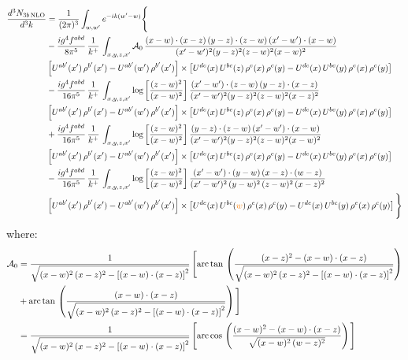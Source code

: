 \documentclass[9pt]{article}
\numberwithin{equation}{section}
\begin{document}
\begin{align}
\frac{d^{3}N_{3b\,\rm NLO}}{d^{3}k} & = \frac{1}{(2\pi)^{3}}\int_{w,w'}e^{-ik(w'-w)}\Bigg\{\notag \\
&-\frac{ig^{4}f^{abd}}{8\pi^{5}}\,\frac{1}{k^{+}}\,\int_{x,y,z,x'}\mathcal{A}_{0}\,
\frac{(x-w)\cdot(x-z)\,(y-z)\cdot(z-w)\,(x'-w')\cdot(x-w)}{(x'-w')^{2}(y-z)^{2}(z-w)^{2}(x-w)^{2}}\notag \\ & \left[U^{ab'}(x')\,\rho^{b'}(x')-U^{ab'}(w')\, \rho^{b'}(x')\right]\times \left[U^{de}(x)\,U^{bc}(z)\, \rho^{e}(x)\,\rho^{c}(y)-U^{de}(x)\,U^{bc}(y)\,\rho^{e}(x)\,\rho^{c}(y)\right] \notag \\
& -\frac{ig^{4}f^{abd}}{16\pi^{5}}\,\frac{1}{k^{+}}\,\int_{x,y,z,x'}\log{\left[\frac{(z-w)^{2}}{(x-w)^{2}}\right]}\,
\frac{(x'-w')\cdot(z-w)\,(y-z)\cdot(x-z)}{(x'-w')^{2}(y-z)^{2}(z-w)^{2}(x-z)^{2}}\notag \\
&\left[U^{ab'}(x')\,\rho^{b'}(x')-U^{ab'}(w')\, \rho^{b'}(x')\right]\times \left[U^{de}(x)\,U^{bc}(z)\, \rho^{e}(x)\,\rho^{c}(y)-U^{de}(x)\,U^{bc}(y)\,\rho^{e}(x)\,\rho^{c}(y)\right] \notag \\
&+ \frac{ig^{4}f^{abd}}{16\pi^{5}}\,\frac{1}{k^{+}}\,\int_{x,y,z,x'}\log{\left[\frac{(z-w)^{2}}{(x-w)^{2}}\right]}\,
\frac{(y-z)\cdot(z-w)\,(x'-w')\cdot(x-w)}{(x'-w')^{2}(y-z)^{2}(z-w)^{2}(x-w)^{2}}\notag \\ 
& \left[U^{ab'}(x')\,\rho^{b'}(x')-U^{ab'}(w')\, \rho^{b'}(x')\right]\times \left[U^{de}(x)\,U^{bc}(z)\, \rho^{e}(x)\,\rho^{c}(y)-U^{de}(x)\,U^{bc}(y)\,\rho^{e}(x)\,\rho^{c}(y)\right]\notag \\ & -\frac{ig^{4}f^{abd}}{16\pi^{5}}\,\frac{1}{k^{+}}\,\int_{x,y,z,x'}\log{\left[\frac{(z-w)^{2}}{(x-w)^{2}}\right]}\,\frac{(x'-w')\cdot(y-w)\,(x-z)\cdot (w-z)}{(x'-w')^{2}\,(y-w)^{2}\,(z-w)^{2}\,(x-z)^{2}}\notag \\ & \left[U^{ab'}(x')\,\rho^{b'}(x')-U^{ab'}(w')\, \rho^{b'}(x')\right]\times \left[U^{de}(x)\,U^{bc}(\textcolor{orange}{w})\, \rho^{e}(x)\,\rho^{c}(y)-U^{de}(x)\,U^{bc}(y)\,\rho^{e}(x)\,\rho^{c}(y)\right]\Bigg\}
\end{align}
where: \begin{align}
\mathcal{A}_{0} & = \frac{1}{\sqrt{(x-w)^{2}\,(x-z)^{2}-\left[(x-w)\cdot (x-z)\right]^{2}}}\, \Bigg[\mathrm{arc\,tan}\,\left(\frac{(x-z)^{2}-(x-w)\cdot (x-z)}{\sqrt{(x-w)^{2}\,(x-z)^{2}-\left[(x-w)\cdot (x-z)\right]^{2}}}\right)\notag \\ & + \mathrm{arc\,tan}\,\left(\frac{(x-w)\cdot (x-z)}{\sqrt{(x-w)^{2}\,(x-z)^{2}-\left[(x-w)\cdot (x-z)\right]^{2}}}\right) \Bigg]\notag \\ & = \frac{1}{\sqrt{(x-w)^{2}\,(x-z)^{2}-\left[(x-w)\cdot (x-z)\right]^{2}}}\, \Bigg[\mathrm{arc\,cos}\,\left(\frac{(x-w)^{2}-(x-w)\cdot (x-z)}{\sqrt{(x-w)^{2}\,(w-z)^{2}}}\right)\Bigg]
\end{align}
\end{document}
